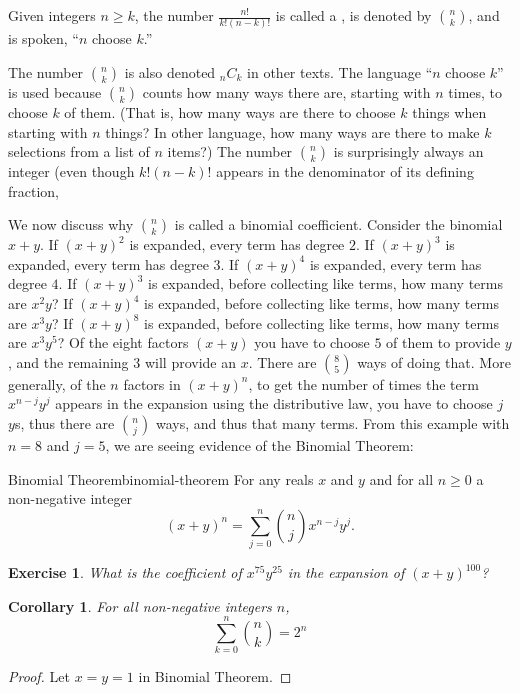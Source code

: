 \documentclass{book}
\newcounter{ekcounter}%
\theoremstyle{ekimcustom}
\newtheorem{corollary}[ekcounter]{Corollary}
\newtheorem{exercise}[ekcounter]{Exercise}
\newcommand\defn[1]{{\color{blue}{\bf #1}}}
\begin{document}
\begin{bdefinition}{}{}
Given integers $n \geq k$, the number $\frac{n!}{k!(n-k)!}$ is called a \defn{binomial coefficient}, is denoted by $\binom{n}{k}$, and is spoken, ``$n$ choose $k$.''
\end{bdefinition}
The number $\binom{n}{k}$ is also denoted ${}_nC_k$ in other texts. The language ``$n$ choose $k$'' is used because $\binom{n}{k}$ counts how many ways there are, starting with $n$ times, to choose $k$ of them. (That is, how many ways are there to choose $k$ things when starting with $n$ things? In other language, how many ways are there to make $k$ selections from a list of $n$ items?) The number $\binom{n}{k}$ is surprisingly always an integer (even though $k!(n-k)!$ appears in the denominator of its defining fraction,

We now discuss why $\binom{n}{k}$ is called a binomial coefficient. Consider the binomial $x+y$.
If $(x+y)^2$ is expanded, every term has degree $2$.
If $(x+y)^3$ is expanded, every term has degree $3$.
If $(x+y)^4$ is expanded, every term has degree $4$.
If $(x+y)^3$ is expanded, before collecting like terms, how many terms are $x^2y$?
If $(x+y)^4$ is expanded, before collecting like terms, how many terms are $x^3y$?
If $(x+y)^8$ is expanded, before collecting like terms,  how many terms are $x^3y^5$?
Of the eight factors $(x+y)$ you have to choose $5$ of them to provide $y$, and the remaining $3$ will provide an $x$. There are $\binom{8}{5}$ ways of doing that. More generally, of the $n$ factors in $(x+y)^n$, to get the number of times the term $x^{n-j}y^j$ appears in the expansion using the distributive law, you have to choose $j$ $y$s, thus there are $\binom{n}{j}$ ways, and thus that many terms. From this example with $n=8$ and $j=5$, we are seeing evidence of the Binomial Theorem:
\begin{btheorem}{Binomial Theorem}{binomial-theorem}
For any reals $x$ and $y$ and for all $n \geq 0$ a non-negative integer
\[(x+y)^n = \sum_{j=0}^n \binom{n}{j}x^{n-j}y^j.\]
\end{btheorem}

\begin{exercise}
What is the coefficient of $x^{75}y^{25}$ in the expansion of $(x+y)^{100}$?
\end{exercise}

\begin{corollary}
For all non-negative integers $n$,
\[\sum_{k=0}^n \binom{n}{k}=2^n\]
\end{corollary}
\begin{proof}
Let $x=y=1$ in Binomial Theorem.
\end{proof}
\end{document}
